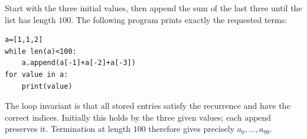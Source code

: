 Start with the three initial values, then append the sum of the last three until the list has length $100$. The following program prints exactly the requested terms:
\begin{verbatim}
a=[1,1,2]
while len(a)<100:
    a.append(a[-1]+a[-2]+a[-3])
for value in a:
    print(value)
\end{verbatim}
The loop invariant is that all stored entries satisfy the recurrence and have the correct indices. Initially this holds by the three given values; each append preserves it. Termination at length $100$ therefore gives precisely $a_0,\ldots,a_{99}$.
